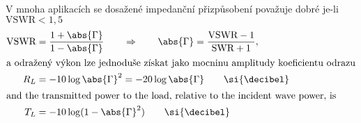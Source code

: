      V mnoha aplikacích se dosažené impedanční přizpůsobení považuje dobré je-li \(\text{VSWR}<1,5\)
     \begin{align}
       \text{VSWR} &= \frac{1+\abs{\Gamma}}{1-\abs{\Gamma}} \qquad \Rightarrow \qquad
                     \abs{\Gamma} = \frac{\text{VSWR}-1}{\text{SWR}+1}, \\
       \shortintertext{a odražený výkon lze jednoduše získat jako mocninu amplitudy koeficientu 
         odrazu} 
       R_L &= -10\log\abs{\Gamma}^2 = -20\log\abs{\Gamma} \qquad\si{\decibel} \\
       \shortintertext{and the transmitted power to the load, relative to the incident wave power, 
         is}
       T_L &= -10\log(1 - \abs{\Gamma}^2) \qquad\si{\decibel}
     \end{align}
     
